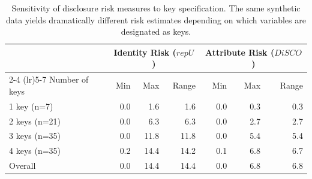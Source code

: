 \begin{table}[h]
\footnotesize\sf\centering
\caption{Sensitivity of disclosure risk measures to key specification. The same synthetic data yields dramatically different risk estimates depending on which variables are designated as keys.\label{tab:key_sensitivity}}
\begin{tabular}{@{}lrrrrrr@{}}
\toprule
 & \multicolumn{3}{c}{Identity Risk ($repU$)} & \multicolumn{3}{c}{Attribute Risk ($DiSCO$)} \\
\cmidrule(lr){2-4} \cmidrule(lr){5-7}
Number of keys & Min & Max & Range & Min & Max & Range \\
\midrule
1 key (n=7) & 0.0 & 1.6 & 1.6 & 0.0 & 0.3 & 0.3 \\
2 keys (n=21) & 0.0 & 6.3 & 6.3 & 0.0 & 2.7 & 2.7 \\
3 keys (n=35) & 0.0 & 11.8 & 11.8 & 0.0 & 5.4 & 5.4 \\
4 keys (n=35) & 0.2 & 14.4 & 14.2 & 0.1 & 6.8 & 6.7 \\
\midrule
Overall & 0.0 & 14.4 & 14.4 & 0.0 & 6.8 & 6.8 \\
\bottomrule
\end{tabular}
\end{table}

